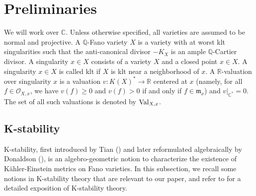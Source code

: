 \documentclass[12pt]{amsart}
\newtheorem{thm}{Theorem}[section]
\theoremstyle{definition}
\def\val{{\rm Val}}
\newcommand{\IC}{{\mathbb C}}
\newcommand{\IP}{{\mathbb P}}
\newcommand{\IQ}{{\mathbb Q}}
\newcommand{\IR}{{\mathbb R}}
\newcommand{\CO}{{\mathcal O}}
\newcommand{\gee}{\geqslant}
\begin{document}









\section{Preliminaries}
We will work over $\IC$. Unless otherwise specified, all varieties are assumed to be normal and projective. A $\IQ$-Fano variety $X$ is a variety with at worst klt singularities such that the anti-canonical divisor $-K_X$ is an ample $\IQ$-Cartier divisor. A singularity $x\in X$ consists of a variety $X$ and a closed point $x \in X$. A singularity $x \in X$ is called klt if $X$ is klt near a neighborhood of $x$. A $\IR$-valuation over singularity $x$ is a valuation $v\colon K(X)^*\rightarrow \IR$ centered at $x$ (namely, for all $f \in \CO_{X,x}$, we have $v(f)\gee 0$  and $v(f)>0$ if and only if $f \in \mathfrak{m}_x$) and $v|_{\IC^*}=0$. The set of all such valuations is denoted by $\val_{X,x}$. 
\subsection{K-stability}
K-stability, first introduced by Tian (\cite{Tia97}) and later reformulated algebraically by Donaldson (\cite{Don02}), is an algebro-geometric notion to characterize the existence of K\"ahler-Einstein metrics on Fano varieties. In this subsection, we recall some notions in K-stability theory that are relevant to our paper, and refer to \cite{Xu23} for a detailed exposition of K-stability theory. 
\end{document}
